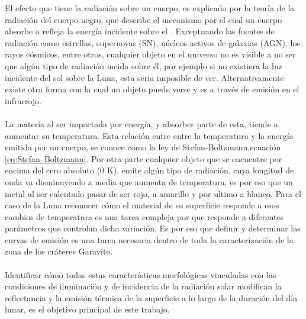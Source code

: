 \documentclass[12pt]{article}
\begin{document}
El efecto que tiene la radiación sobre un cuerpo, es explicado por la teoría de la radiación 
del cuerpo negro, que describe el mecanismo por el cual un cuerpo absorbe o refleja la energía 
incidente sobre el \parencite{rybicki1991radiative}. Exceptuando las fuentes de radiación como estrellas, 
supernovas (SN), 
núcleos activos de galaxias (AGN), los rayos cósmicos, entre otros, cualquier objeto 
en el universo no es visible a no ser que algún tipo de radiación incida 
sobre él, por ejemplo si no existiera la luz incidente del sol sobre la Luna, esta seria imposible 
de ver. Alternativamente existe otra forma con la cual un objeto puede verse y es a través 
de emisión en el infrarrojo. \\
\\
La materia al ser impactada por energía, y absorber parte de esta, 
tiende a aumentar su temperatura. Esta relación entre entre la temperatura 
y la energía emitida por un cuerpo, se conoce como la ley de Stefan-Boltzmann,ecuación 
\ref{eq:Stefan–Boltzmann}\parencite{rybicki1991radiative}.
Por otra parte cualquier objeto que se encuentre por 
encima del cero absoluto (0 K), emite algún tipo de radiación, cuya longitud de onda va disminuyendo 
a media que aumenta de temperatura, es por eso que un metal al ser calentado pasar de ser rojo, a 
amarillo  y por ultimo a blanco. 
Para el caso de la Luna reconocer cómo el material de su superficie responde a esos cambios 
de temperatura es una tarea compleja por que responde a diferentes parámetros que controlan
dicha variación. Es por eso que definir y determinar las curvas de emisión es una tarea necesaria 
dentro de toda la caracterización de la zona de los cráteres Garavito.\\
\\
Identificar cómo todas estas características morfológicas vinculadas con las condiciones 
de iluminación y de incidencia de la radiación solar modifican la 
reflectancia y la emisión térmica de la superficie a lo largo de la duración del día lunar, es 
el objetivo principal de este trabajo.\\
\end{document}

